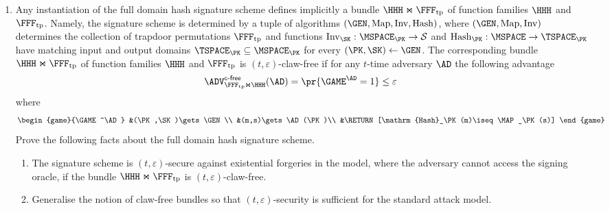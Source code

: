 \documentclass{article}
\newcommand{\FFFTP}{\FFF_{\mathrm{tp}}}
\newcommand{\HASH}{\mathrm{Hash}}
\begin{document}
\begin{enumerate}
\item Any instantiation of the full domain hash signature scheme
  defines implicitly a bundle $\HHH\Join\FFFTP$ of function families
  $\HHH$ and $\FFFTP$. Namely, the signature scheme is determined by a
  tuple of algorithms $(\GEN,\MAP,\INV,\HASH)$, where
  $(\GEN,\MAP,\INV)$ determines the collection of trapdoor
  permutations $\FFFTP$ and functions $\INV_\SK:\MSPACE_\PK\to\SSPACE$
  and $\HASH_\PK:\MSPACE\to\TSPACE_\PK$ have matching input and output
  domains $\TSPACE_\PK\subseteq \MSPACE_\PK$ for every
  $(\PK,\SK)\gets\GEN$. The corresponding bundle $\HHH\Join\FFFTP$ of
  function families $\HHH$ and $\FFFTP$ is
  $(t,\varepsilon)$-claw-free if for any $t$-time adversary $\AD$
  the following advantage
  \begin{align*}
    \advCFXX{\FFFTP\Join\HHH}{\AD}=\pr{\GAME^\AD=1}\leq\varepsilon\enspace
  \end{align*}
  where
  \begin{align*}
    \begin{game}{\GAME^\AD}
      &(\PK,\SK)\gets\GEN\\
      &(m,s)\gets\AD(\PK)\\
      &\RETURN [\HASH_\PK(m)\iseq \MAP_\PK(s)]
    \end{game}
  \end{align*}
  Prove the following facts about the full domain hash signature
  scheme.
  \begin{enumerate}
  \item The signature scheme is $(t,\varepsilon)$-secure against
    existential forgeries in the model, where the adversary cannot
    access the signing oracle, if the bundle $\HHH\Join\FFFTP$ is
    $(t,\varepsilon)$-claw-free.
  \item Generalise the notion of claw-free bundles so that
    $(t,\varepsilon)$-security is sufficient for the standard attack
    model.
  \end{enumerate}


\end{enumerate}
\end{document}
